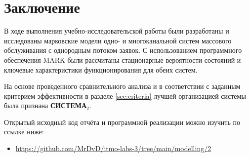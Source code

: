 \section{Заключение}

В ходе выполнения учебно-исследовательской работы были разработаны и исследованы марковские модели одно- и многоканальной систем массового обслуживания с однородным потоком заявок. С использованием программного обеспечения MARK были рассчитаны стационарные вероятности состояний и ключевые характеристики функционирования для обеих систем.

На основе проведенного сравнительного анализа и в соответствии с заданным критерием эффективности в разделе \ref{sec:criteria} лучшей организацией системы была признана \textbf{СИСТЕМА$_2$}.

Открытый исходный код отчёта и программной реализации можно изучить по ссылке ниже:
\begin{itemize}
    \item \url{https://github.com/MrDvD/itmo-labs-3/tree/main/modelling/2}
\end{itemize}